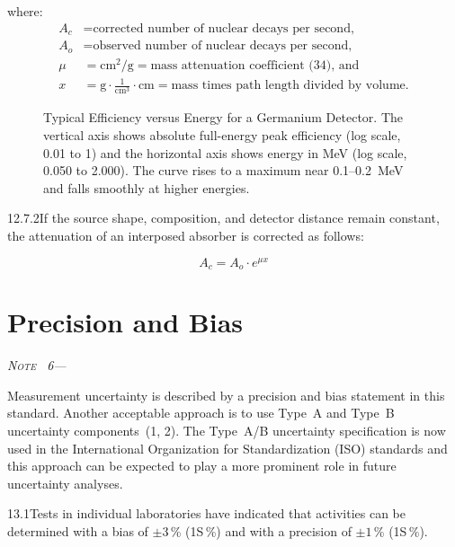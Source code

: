 \documentclass[12pt]{article}
\newenvironment{astmnote}[1][\relax]{%
  \par\smallskip\noindent\textit{N\textsc{ote}%
  \ifx#1\relax\else~#1\fi---}\ignorespaces
}{%
  \par\smallskip
}
\begin{document}
\noindent where:
\begin{align*}
  A_c &= \text{corrected number of nuclear decays per second,}\\
  A_o &= \text{observed number of nuclear decays per second,}\\
  \mu &= \text{cm}^2/\text{g} = \text{mass attenuation coefficient~(34), and}\\
  x   &= \text{g}\cdot\tfrac{1}{\text{cm}^3}\cdot\text{cm}
        = \text{mass times path length divided by volume.}
\end{align*}

\begin{figure}[ht]
\centering
\fbox{\rule{0pt}{3in}\rule{4.5in}{0pt}}
\caption{Typical Efficiency versus Energy for a Germanium Detector. The vertical
axis shows absolute full-energy peak efficiency (log scale, 0.01 to 1) and the
horizontal axis shows energy in MeV (log scale, 0.050 to 2.000). The curve rises
to a maximum near 0.1--0.2~MeV and falls smoothly at higher energies.}
\label{fig:efficiency_curve}
\end{figure}

12.7.2\quad If the source shape, composition, and detector distance remain constant, the
attenuation of an interposed absorber is corrected as follows:

\begin{equation}
  A_c = A_o\cdot e^{\mu x}
  \label{eq:absorber_attenuation}
\end{equation}

\section{Precision and Bias}

\begin{astmnote}[6]
Measurement uncertainty is described by a precision and bias statement in this standard.
Another acceptable approach is to use Type~A and Type~B uncertainty components~(1, 2).
The Type~A/B uncertainty specification is now used in the International Organization for
Standardization (ISO) standards and this approach can be expected to play a more
prominent role in future uncertainty analyses.
\end{astmnote}

13.1\quad Tests in individual laboratories have indicated that activities can be determined
with a bias of $\pm 3$\,\% (1S\,\%) and with a precision of $\pm 1$\,\% (1S\,\%).
\end{document}
